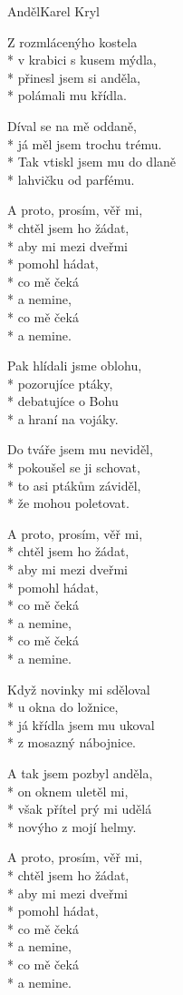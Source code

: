 \documentclass[10.5pt]{book}
\begin{document}
\begin{poem}{Anděl}{Karel Kryl}

\settowidth{\versewidth}{Když novinky mi sděloval}

Z rozmlácenýho kostela\\*
v krabici s kusem mýdla,\\*
přinesl jsem si anděla,\\*
polámali mu křídla.

Díval se na mě oddaně,\\*
já měl jsem trochu trému.\\*
Tak vtiskl jsem mu do dlaně\\*
lahvičku od parfému.

A proto, prosím, věř mi,\\*
chtěl jsem ho žádat,\\*
aby mi mezi dveřmi\\*
pomohl hádat,\\*
co mě čeká\\*
a nemine,\\*
co mě čeká\\*
a nemine.

Pak hlídali jsme oblohu,\\*
pozorujíce ptáky,\\*
debatujíce o Bohu\\*
a hraní na vojáky.

Do tváře jsem mu neviděl,\\*
pokoušel se ji schovat,\\*
to asi ptákům záviděl,\\*
že mohou poletovat.

A proto, prosím, věř mi,\\*
chtěl jsem ho žádat,\\*
aby mi mezi dveřmi\\*
pomohl hádat,\\*
co mě čeká\\*
a nemine,\\*
co mě čeká\\*
a nemine.

Když novinky mi sděloval\\*
u okna do ložnice,\\*
já křídla jsem mu ukoval\\*
z mosazný nábojnice.

A tak jsem pozbyl anděla,\\*
on oknem uletěl mi,\\*
však přítel prý mi udělá\\*
novýho z mojí helmy.

A proto, prosím, věř mi,\\*
chtěl jsem ho žádat,\\*
aby mi mezi dveřmi\\*
pomohl hádat,\\*
co mě čeká\\*
a nemine,\\*
co mě čeká\\*
a nemine.

\end{poem}
\end{document}
